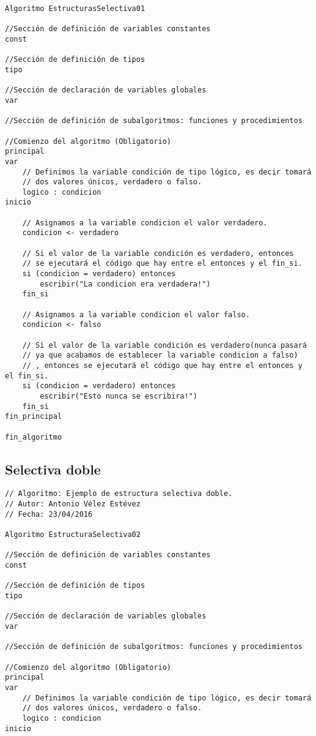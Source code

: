 \documentclass{article}
\begin{document}
\begin{appendices}
\begin{lstlisting}[language = pseudocodigoesp]
Algoritmo EstructurasSelectiva01

//Sección de definición de variables constantes
const 
	
//Sección de definición de tipos
tipo

//Sección de declaración de variables globales	
var

//Sección de definición de subalgoritmos: funciones y procedimientos	

//Comienzo del algoritmo (Obligatorio)
principal	
var
	// Definimos la variable condición de tipo lógico, es decir tomará
	// dos valores únicos, verdadero o falso.
	logico : condicion
inicio 	

	// Asignamos a la variable condicion el valor verdadero.
	condicion <- verdadero
	
	// Si el valor de la variable condición es verdadero, entonces
	// se ejecutará el código que hay entre el entonces y el fin_si.
	si (condicion = verdadero) entonces
		escribir("La condicion era verdadera!")
	fin_si
	
	// Asignamos a la variable condicion el valor falso.
	condicion <- falso
	
	// Si el valor de la variable condición es verdadero(nunca pasará
	// ya que acabamos de establecer la variable condicion a falso)
	// , entonces se ejecutará el código que hay entre el entonces y el fin_si.
	si (condicion = verdadero) entonces 
		escribir("Esto nunca se escribira!")
	fin_si
fin_principal

fin_algoritmo

\end{lstlisting}
\subsection{Selectiva doble}
\begin{lstlisting}[language = pseudocodigoesp]
// Algoritmo: Ejemplo de estructura selectiva doble.
// Autor: Antonio Vélez Estévez
// Fecha: 23/04/2016

Algoritmo EstructuraSelectiva02

//Sección de definición de variables constantes
const 
	
//Sección de definición de tipos
tipo

//Sección de declaración de variables globales	
var

//Sección de definición de subalgoritmos: funciones y procedimientos	

//Comienzo del algoritmo (Obligatorio)
principal	
var
	// Definimos la variable condición de tipo lógico, es decir tomará
	// dos valores únicos, verdadero o falso.
	logico : condicion
inicio 	


\end{lstlisting}
\end{appendices}
\end{document}
